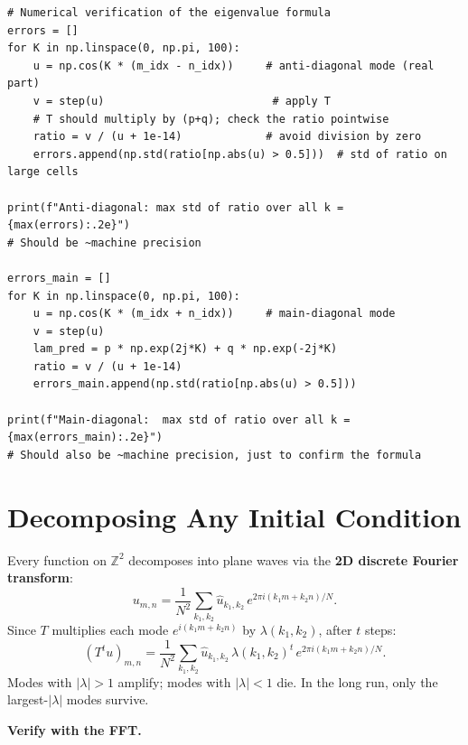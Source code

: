 \documentclass[11pt]{article}
\begin{document}
\begin{lstlisting}
# Numerical verification of the eigenvalue formula
errors = []
for K in np.linspace(0, np.pi, 100):
    u = np.cos(K * (m_idx - n_idx))     # anti-diagonal mode (real part)
    v = step(u)                          # apply T
    # T should multiply by (p+q); check the ratio pointwise
    ratio = v / (u + 1e-14)             # avoid division by zero
    errors.append(np.std(ratio[np.abs(u) > 0.5]))  # std of ratio on large cells

print(f"Anti-diagonal: max std of ratio over all k = {max(errors):.2e}")
# Should be ~machine precision

errors_main = []
for K in np.linspace(0, np.pi, 100):
    u = np.cos(K * (m_idx + n_idx))     # main-diagonal mode
    v = step(u)
    lam_pred = p * np.exp(2j*K) + q * np.exp(-2j*K)
    ratio = v / (u + 1e-14)
    errors_main.append(np.std(ratio[np.abs(u) > 0.5]))

print(f"Main-diagonal:  max std of ratio over all k = {max(errors_main):.2e}")
# Should also be ~machine precision, just to confirm the formula
\end{lstlisting}


\section*{Decomposing Any Initial Condition}

\noindent
Every function on $\mathbb{Z}^2$ decomposes into plane waves via the
\textbf{2D discrete Fourier transform}:
\[
  u_{m,n} = \frac{1}{N^2} \sum_{k_1,k_2} \hat{u}_{k_1,k_2}\,
            e^{2\pi i(k_1 m + k_2 n)/N}.
\]
Since $T$ multiplies each mode $e^{i(k_1 m + k_2 n)}$ by
$\lambda(k_1,k_2)$, after $t$ steps:
\[
  (T^t u)_{m,n} = \frac{1}{N^2} \sum_{k_1,k_2} \hat{u}_{k_1,k_2}\,
  \lambda(k_1,k_2)^t\,e^{2\pi i(k_1 m + k_2 n)/N}.
\]
Modes with $|\lambda| > 1$ amplify; modes with $|\lambda| < 1$ die.
In the long run, only the largest-$|\lambda|$ modes survive.

\medskip\noindent
\textbf{Verify with the FFT.}
\end{document}
